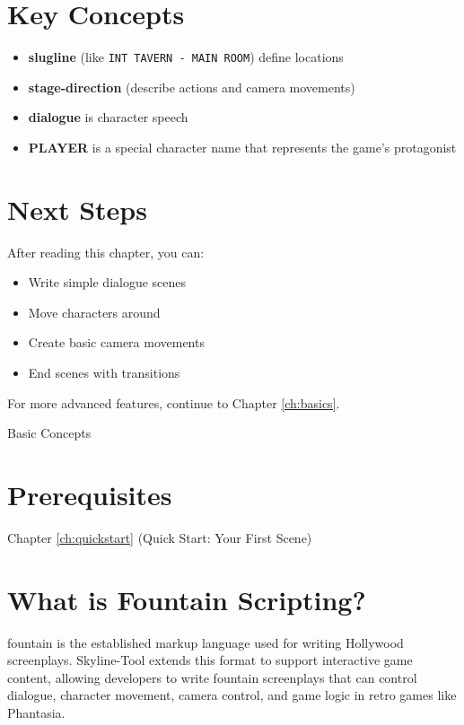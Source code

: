 \documentclass[11pt,letterpaper,oldstylefigures]{memoir}
\makeatletter
\let\oldchapter\chapter
\def\chapter{%
  \@ifstar
    {\FountainScripting@starchapter}%
    {\@dblarg\FountainScripting@chapter}}
\def\FountainScripting@starchapter#1{\oldchapter*{#1}\chaptermark{#1}}
\def\FountainScripting@chapter[#1]#2{\oldchapter[#1]{#2}\chaptermark{#2}}
\newcommand{\Phantasia}{{\irishfont Phantasia}}
\makeatother
\begin{document}
\section{Key Concepts}
\begin{itemize}
\item \textbf{\gls{slugline}} (like \texttt{INT TAVERN - MAIN ROOM}) define locations
\item \textbf{\gls{stage-direction}} (describe actions and camera movements)
\item \textbf{\gls{dialogue}} is character speech
\item \textbf{PLAYER} is a special \gls{character} name that represents the game's protagonist
\end{itemize}

\section{Next Steps}
After reading this chapter, you can:
\begin{itemize}
\item Write simple dialogue scenes
\item Move characters around
\item Create basic camera movements
\item End scenes with transitions
\end{itemize}

For more advanced features, continue to Chapter \ref{ch:basics}.

\chapter{Basic Concepts}
\label{ch:basics}


\section{Prerequisites}
Chapter \ref{ch:quickstart} (Quick Start: Your First Scene)

\section{What is Fountain Scripting?}

\gls{fountain} is the established markup language used for writing Hollywood screenplays. Skyline-Tool extends this format to support interactive game content, allowing developers to write \gls{fountain} screenplays that can control \gls{dialogue}, \gls{character} movement, \gls{camera} control, and game logic in retro games like \Phantasia.
\end{document}
